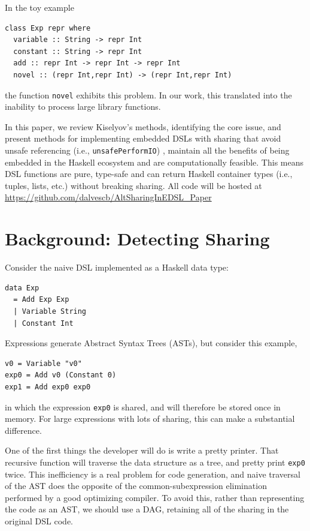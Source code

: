 \documentclass[runningheads]{llncs}
\begin{document}
In the toy example
\begin{verbatim}
class Exp repr where
  variable :: String -> repr Int
  constant :: String -> repr Int
  add :: repr Int -> repr Int -> repr Int
  novel :: (repr Int,repr Int) -> (repr Int,repr Int)
\end{verbatim}
the function \texttt{novel} exhibits this problem.
 In our work,
this translated into the inability to process large library functions.

\smallskip
In this paper, we review Kiselyov's methods, identifying the core issue, and
present methods for implementing embedded DSLs with sharing that avoid  unsafe referencing (i.e., \texttt{unsafePerformIO}) \cite{gill:observablesharing}, maintain all the benefits of being embedded in the Haskell ecosystem and are computationally feasible. This
means DSL functions are pure, type-safe and can return Haskell container types (i.e.,
tuples, lists, etc.) without breaking sharing. All code will be hosted at \url{https://github.com/dalvescb/AltSharingInEDSL_Paper}

\section{Background: Detecting Sharing}

Consider the naive DSL implemented as a Haskell data type:
\begin{verbatim}
data Exp
  = Add Exp Exp
  | Variable String
  | Constant Int
\end{verbatim}
Expressions generate Abstract Syntax Trees (ASTs),
but consider this example,
\begin{verbatim}
v0 = Variable "v0"
exp0 = Add v0 (Constant 0)
exp1 = Add exp0 exp0
\end{verbatim}
in which the expression  \texttt{exp0} is shared,
and will therefore be stored once in memory.
For large expressions with lots of sharing,
this can make a substantial difference.

One of the first things the developer will do is write a pretty printer.
That recursive function will traverse the data structure as a tree,
and pretty print \texttt{exp0} twice.
This inefficiency is a real problem for code generation,
and naive traversal of the AST does the opposite of the common-subexpression elimination performed by a good optimizing compiler.
To avoid this,
rather than representing the code as an AST, 
we should use a DAG, retaining all of the sharing in the original DSL code. 
\end{document}
